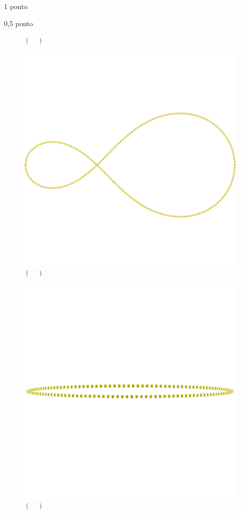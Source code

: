 \documentclass{../lista}
\begin{document}
\begin{questao}{1 ponto}
\begin{pergunta}{0,5 ponto}
\begin{multicols}{2}
\begin{figure}[H]
					\captionsetup{labelformat=empty}
					\caption{$(\quad)$}
				\end{figure}
				\begin{figure}[H]
					\centering
					\includegraphics[scale=0.15]{./img/5c}
					\captionsetup{labelformat=empty}
					\caption{$(\quad)$}
				\end{figure}
				\begin{figure}[H]
					\centering
					\includegraphics[scale=0.15]{./img/5d}
					\captionsetup{labelformat=empty}
					\caption{$(\quad)$}
				\end{figure}
			\end{multicols}
		\end{pergunta}


\end{questao}
\end{document}
